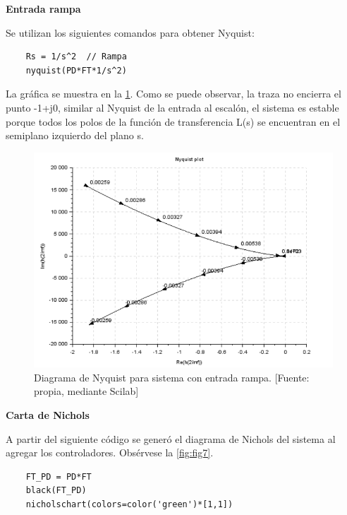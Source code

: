 \documentclass[12pt,letterpaper]{article}
\begin{document}
\bigskip

\textbf{Entrada rampa}

Se utilizan los siguientes comandos para obtener Nyquist:

\begin{verbatim}
    Rs = 1/s^2  // Rampa
    nyquist(PD*FT*1/s^2)
\end{verbatim}

\bigskip

La gráfica se muestra en la \ref{fig:fig6}. Como se puede observar, la traza no encierra el punto -1+j0, similar al Nyquist de la entrada al escalón, el sistema es estable porque todos los polos de la función de transferencia L(s) se encuentran en el semiplano izquierdo del plano s.

\begin{figure}[hbtp]
	\centering
	\includegraphics[width = 0.75 \columnwidth]{52rampa.png} 
	\caption[Figura3]{Diagrama de Nyquist para sistema con entrada rampa. [Fuente: propia, mediante Scilab]} 
	\label{fig:fig6} 
\end{figure}

\bigskip

\bigskip

\textbf{Carta de Nichols}

A partir del siguiente código se generó el diagrama de Nichols del sistema al agregar los controladores. Obsérvese la \ref{fig:fig7}.

\begin{verbatim}
    FT_PD = PD*FT
    black(FT_PD)
    nicholschart(colors=color('green')*[1,1])
\end{verbatim}
\end{document}
